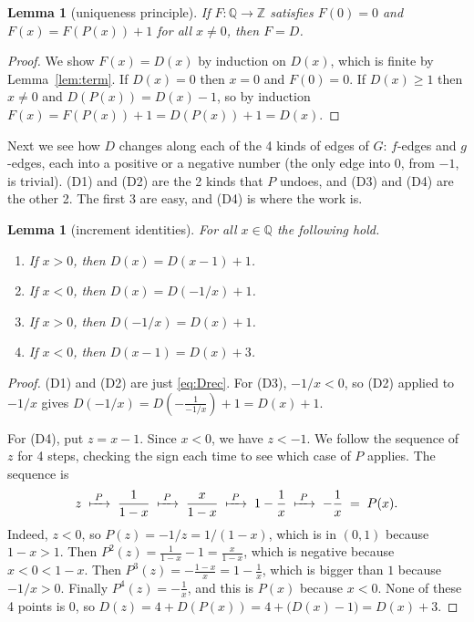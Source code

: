 \documentclass[11pt]{article}
\newtheorem{lemma}[theorem]{Lemma}
\theoremstyle{definition}
\theoremstyle{remark}
\newcommand{\Q}{\mathbb{Q}}
\newcommand{\Z}{\mathbb{Z}}
\begin{document}
\begin{lemma}[uniqueness principle]\label{lem:unique}
If $F:\Q\to\Z$ satisfies $F(0)=0$ and $F(x)=F(P(x))+1$ for all $x\neq0$, then $F=D$.
\end{lemma}

\begin{proof}
We show $F(x)=D(x)$ by induction on $D(x)$, which is finite by Lemma~\ref{lem:term}. If $D(x)=0$
then $x=0$ and $F(0)=0$. If $D(x)\ge1$ then $x\neq0$ and $D(P(x))=D(x)-1$, so by induction
$F(x)=F(P(x))+1=D(P(x))+1=D(x)$.
\end{proof}

Next we see how $D$ changes along each of the 4 kinds of edges of $G$: $f$-edges and $g$-edges,
each into a positive or a negative number (the only edge into $0$, from $-1$, is trivial). (D1) and (D2) are the 2 kinds that $P$ undoes, and (D3)
and (D4) are the other 2. The first 3 are easy, and (D4) is where the work is.

\begin{lemma}[increment identities]\label{lem:incr}
For all $x\in\Q$ the following hold.
\begin{enumerate}[label={(D\arabic*)}]
\item If $x>0$, then $D(x)=D(x-1)+1$.
\item If $x<0$, then $D(x)=D(-1/x)+1$.
\item If $x>0$, then $D(-1/x)=D(x)+1$.
\item If $x<0$, then $D(x-1)=D(x)+3$.
\end{enumerate}
\end{lemma}

\begin{proof}
(D1) and (D2) are just \eqref{eq:Drec}. For (D3), $-1/x<0$, so (D2) applied to $-1/x$ gives
$D(-1/x)=D\!\left(-\tfrac{1}{-1/x}\right)+1=D(x)+1$.

For (D4), put $z=x-1$. Since $x<0$, we have $z<-1$. We follow the sequence of $z$ for 4 steps,
checking the sign each time to see which case of $P$ applies. The sequence is
\[
z \;\xmapsto{\;P\;}\; \frac{1}{1-x}
\;\xmapsto{\;P\;}\; \frac{x}{1-x}
\;\xmapsto{\;P\;}\; 1-\frac1x
\;\xmapsto{\;P\;}\; -\frac1x \;=\;P(x).
\]
Indeed, $z<0$, so $P(z)=-1/z=1/(1-x)$, which is in $(0,1)$ because $1-x>1$. Then
$P^2(z)=\tfrac{1}{1-x}-1=\tfrac{x}{1-x}$, which is negative because $x<0<1-x$. Then
$P^3(z)=-\tfrac{1-x}{x}=1-\tfrac1x$, which is bigger than $1$ because $-1/x>0$. Finally
$P^4(z)=-\tfrac1x$, and this is $P(x)$ because $x<0$. None of these 4 points is $0$, so
$D(z)=4+D(P(x))=4+\bigl(D(x)-1\bigr)=D(x)+3$.
\end{proof}
\end{document}

